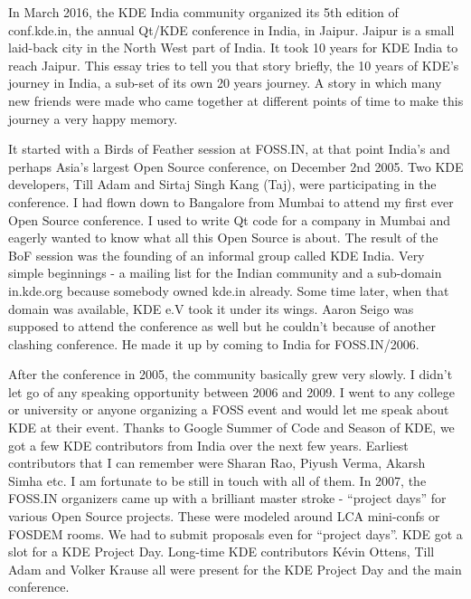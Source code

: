 

\noindent{}In March 2016, the KDE India community organized its 5th edition of conf.kde.in, the annual Qt/KDE conference in India, in Jaipur. Jaipur is a small laid-back city in the North West part of India. It took 10 years for KDE India to reach Jaipur. This essay tries to tell you that story briefly, the 10 years of KDE's journey in India, a sub-set of its own 20 years journey. A story in which many new friends were made who came together at different points of time to make this journey a very happy memory.

It started with a Birds of Feather session at FOSS.IN, at that point India's and perhaps Asia's largest Open Source conference, on December 2nd 2005. Two KDE developers, Till Adam and Sirtaj Singh Kang (Taj), were participating in the conference. I had flown down to Bangalore from Mumbai to attend my first ever Open Source conference. I used to write Qt code for a company in Mumbai and eagerly wanted to know what all this Open Source is about. The result of the BoF session was the founding of an informal group called KDE India. Very simple beginnings - a mailing list for the Indian community and a sub-domain in.kde.org because somebody owned kde.in already. Some time later, when that domain was available, KDE e.V took it under its wings. Aaron Seigo was supposed to attend the conference as well but he couldn't because of another clashing conference. He made it up by coming to India for FOSS.IN/2006.

After the conference in 2005, the community basically grew very slowly. I didn't let go of any speaking opportunity between 2006 and 2009. I went to any college or university or anyone organizing a FOSS event and would let me speak about KDE at their event.  Thanks to Google Summer of Code and Season of KDE, we got a few KDE contributors from India over the next few years. Earliest contributors that I can remember were Sharan Rao, Piyush Verma, Akarsh Simha etc. I am fortunate to be still in touch with all of them. In 2007, the FOSS.IN organizers came up with a brilliant master stroke - “project days” for various Open Source projects. These were modeled around LCA mini-confs or FOSDEM rooms. We had to submit proposals even for “project days”. KDE got a slot for a KDE Project Day. Long-time KDE contributors Kévin Ottens, Till Adam and Volker Krause all were present for the KDE Project Day and the main conference.

